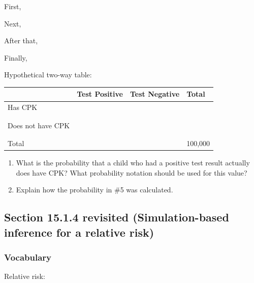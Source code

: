 \documentclass[
]{report}
\newcommand{\rgs}{\vspace{12pt}} %
\newcommand{\rgi}{\hspace{24pt}}  %
\begin{document}
\rgi First,
\rgs

\rgi Next,
\rgs

\rgi After that,
\rgs

\rgi Finally,
\rgs

\rgi Hypothetical two-way table:

\begin{center}
\begin{tabular}{|l|p{1.3in}|p{1.3in}|p{1.3in}|}
\hline
&   Test Positive   & Test Negative & Total \\ \hline
Has CPK     & & & \\
    & & & \\
    & & & \\ \hline
Does not have CPK       & & & \\
    & & & \\
    & & & \\ \hline
Total & & & 100,000 \\ \hline
\end{tabular}
\end{center}
\rgs

\begin{enumerate}
\def\labelenumi{\arabic{enumi}.}
\setcounter{enumi}{4}
\item
  What is the probability that a child who had a positive test result actually does have CPK? What probability notation should be used for this value?
  \rgs
\item
  Explain how the probability in \#5 was calculated.
\end{enumerate}

\newpage

\hypertarget{section-15.1.4-revisited-simulation-based-inference-for-a-relative-risk}{%
\subsection*{Section 15.1.4 revisited (Simulation-based inference for a relative risk)}\label{section-15.1.4-revisited-simulation-based-inference-for-a-relative-risk}}

\hypertarget{vocabulary-20}{%
\subsubsection*{Vocabulary}\label{vocabulary-20}}

Relative risk:
\rgs
\end{document}
